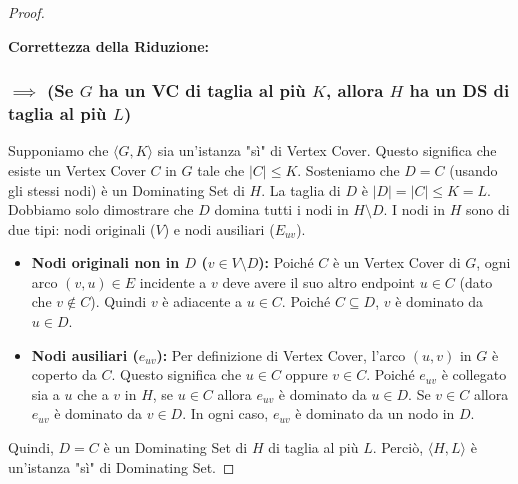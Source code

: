 \documentclass[a4paper]{article}
\theoremstyle{definition} %
\theoremstyle{definition} %
\begin{document}
\begin{proof}
\begin{center}
\end{center}
\label{fig:ds_reduction_graph}

\textbf{Correttezza della Riduzione:}

\subsubsection{$\implies$ (Se $G$ ha un VC di taglia al più $K$, allora $H$ ha un DS di taglia al più $L$)}
Supponiamo che $\langle G, K \rangle$ sia un'istanza "sì" di Vertex Cover. Questo significa che esiste un Vertex Cover $C$ in $G$ tale che $|C| \le K$.
Sosteniamo che $D=C$ (usando gli stessi nodi) è un Dominating Set di $H$. La taglia di $D$ è $|D|=|C| \le K = L$. Dobbiamo solo dimostrare che $D$ domina tutti i nodi in $H \setminus D$.
I nodi in $H$ sono di due tipi: nodi originali ($V$) e nodi ausiliari ($E_{uv}$).
\begin{itemize}
    \item \textbf{Nodi originali non in $D$ ($v \in V \setminus D$):} Poiché $C$ è un Vertex Cover di $G$, ogni arco $(v,u) \in E$ incidente a $v$ deve avere il suo altro endpoint $u \in C$ (dato che $v \notin C$). Quindi $v$ è adiacente a $u \in C$. Poiché $C \subseteq D$, $v$ è dominato da $u \in D$.
    \item \textbf{Nodi ausiliari ($e_{uv}$):} Per definizione di Vertex Cover, l'arco $(u,v)$ in $G$ è coperto da $C$. Questo significa che $u \in C$ oppure $v \in C$. Poiché $e_{uv}$ è collegato sia a $u$ che a $v$ in $H$, se $u \in C$ allora $e_{uv}$ è dominato da $u \in D$. Se $v \in C$ allora $e_{uv}$ è dominato da $v \in D$. In ogni caso, $e_{uv}$ è dominato da un nodo in $D$.
\end{itemize}
Quindi, $D=C$ è un Dominating Set di $H$ di taglia al più $L$. Perciò, $\langle H, L \rangle$ è un'istanza "sì" di Dominating Set.


\end{proof}
\end{document}
